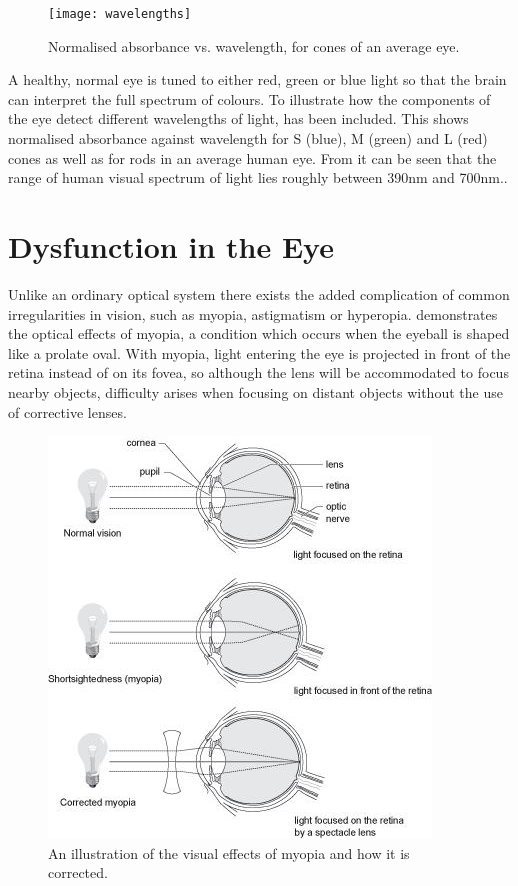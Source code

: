  \begin{figure}[H]
\centering
  \texttt{[image: wavelengths]}
\caption{Normalised absorbance vs. wavelength, for cones of an average eye.\cite{wikicones}}
\label{fig:wavelengths}
\end{figure}

A healthy, normal eye is tuned to either red, green or blue light so that the
brain can interpret the full spectrum of colours. To illustrate how the
components of the eye detect different wavelengths of light,
 has been included. This shows normalised absorbance
against wavelength for S (blue), M (green) and L (red) cones as well as for
rods in an average human eye.  From  it can be seen
that the range of human visual spectrum of light lies roughly between 390nm
and 700nm.\cite{starr2010biology}.

\section{Dysfunction in the Eye}

Unlike an ordinary optical system there exists the added complication
of common irregularities in vision, such as myopia, astigmatism
or hyperopia.  demonstrates the optical effects of myopia,
a condition which occurs when the eyeball is shaped like a prolate oval.
\cite{saine2002ophthalmic} With myopia, light entering the eye is projected
in front of the retina instead of on its fovea, so although the lens will be
accommodated to focus nearby objects, difficulty arises when focusing on 
distant objects without the use of corrective lenses.

\begin{figure}[H]
\centering
\includegraphics{figures/myopia}
\caption{An illustration of the visual effects of myopia and how it is corrected.\cite{yannuzzi2011retinal}}
\label{fig:myop}
\end{figure}

